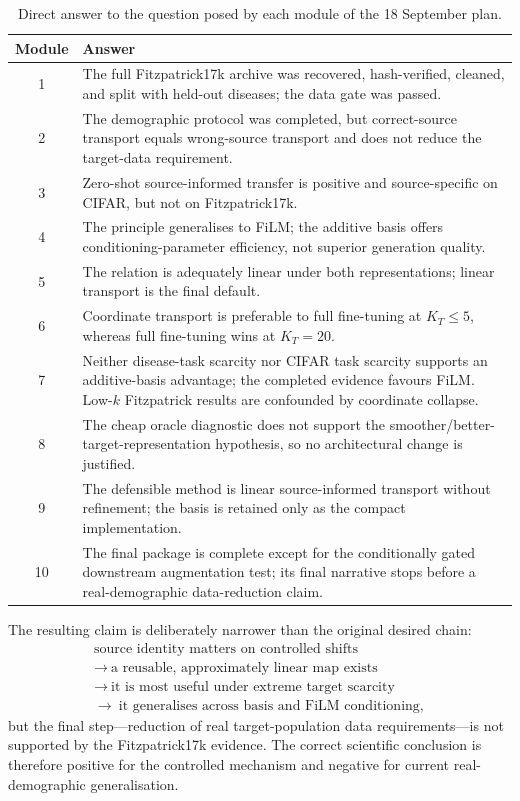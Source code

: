 \documentclass{article}
\newcommand{\KT}{K_T}
\begin{document}
\begin{table}[h]
\caption{Direct answer to the question posed by each module of the 18 September plan.}
\label{tab:verdicts}
\centering
\small
\begin{tabular}{cp{}}
\toprule
Module & Answer \\
\midrule
1 & The full Fitzpatrick17k archive was recovered, hash-verified, cleaned, and split with held-out diseases; the data gate was passed. \\
2 & The demographic protocol was completed, but correct-source transport equals wrong-source transport and does not reduce the target-data requirement. \\
3 & Zero-shot source-informed transfer is positive and source-specific on CIFAR, but not on Fitzpatrick17k. \\
4 & The principle generalises to FiLM; the additive basis offers conditioning-parameter efficiency, not superior generation quality. \\
5 & The relation is adequately linear under both representations; linear transport is the final default. \\
6 & Coordinate transport is preferable to full fine-tuning at $\KT\le5$, whereas full fine-tuning wins at $\KT=20$. \\
7 & Neither disease-task scarcity nor CIFAR task scarcity supports an additive-basis advantage; the completed evidence favours FiLM. Low-$k$ Fitzpatrick results are confounded by coordinate collapse. \\
8 & The cheap oracle diagnostic does not support the smoother/better-target-representation hypothesis, so no architectural change is justified. \\
9 & The defensible method is linear source-informed transport without refinement; the basis is retained only as the compact implementation. \\
10 & The final package is complete except for the conditionally gated downstream augmentation test; its final narrative stops before a real-demographic data-reduction claim. \\
\bottomrule
\end{tabular}
\end{table}

The resulting claim is deliberately narrower than the original desired chain:
\[
\boxed{
\begin{gathered}
\text{source identity matters on controlled shifts}
\\
\rightarrow\ \text{a reusable, approximately linear map exists}
\\
\rightarrow\
\text{it is most useful under extreme target scarcity}
\\
\rightarrow\ \text{it generalises across basis and FiLM conditioning},
\end{gathered}}
\]
but the final step---reduction of real target-population data requirements---is not supported by the Fitzpatrick17k evidence. The correct scientific conclusion is therefore positive for the controlled mechanism and negative for current real-demographic generalisation.
\end{document}
